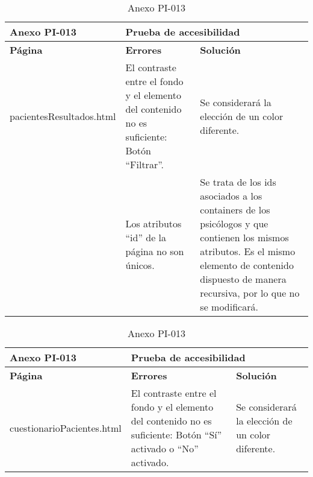 \begin{table}[htpb]
\centering
\begin{tabularx}{\textwidth}{|l|X|X|}
\hline
\rowcolor[gray]{0.9}\textbf{Anexo PI-013}    & \multicolumn{2}{l|}{\textbf{Prueba de accesibilidad}}                                                                                                                                                                                                                                             \\ \hline
\textbf{Página}          & \textbf{Errores}                                                                           & \textbf{Solución}                                                                                                                                                                                    \\ \hline
pacientesResultados.html & El contraste entre el fondo y el elemento del contenido no es suficiente: Botón “Filtrar”. & Se considerará la elección de un color diferente.                                                                                                                                                    \\ 
                         & Los atributos “id” de la página no son únicos.                                             & Se trata de los ids asociados a los containers de los psicólogos y que contienen los mismos atributos. Es el mismo elemento de contenido dispuesto de manera recursiva, por lo que no se modificará. \\ \hline
\end{tabularx}
\caption{Anexo PI-013}
\end{table}


\begin{table}[htpb]
\centering
\begin{tabularx}{\textwidth}{|l|X|X|}
\hline
\rowcolor[gray]{0.9}\textbf{Anexo PI-013}      & \multicolumn{2}{l|}{\textbf{Prueba de accesibilidad}}                                                                                                                                                               \\ \hline
\textbf{Página}            & \textbf{Errores}                                                                                                                                                & \textbf{Solución}                                 \\ \hline
cuestionarioPacientes.html & El contraste entre el fondo y el elemento del contenido no es suficiente: Botón “Sí” activado o “No” activado. & Se considerará la elección de un color diferente.                                                                                                                                                    \\ \hline
\end{tabularx}
\caption{Anexo PI-013}
\end{table}


